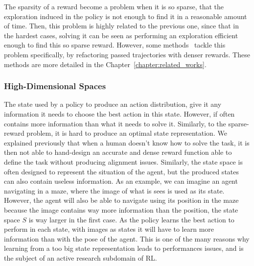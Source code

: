 The sparsity of a reward become a problem when it is so sparse, %
that the exploration induced in the policy is not
enough to find it in a reasonable amount of time.
Then, this problem is highly related to the previous one, since that in the hardest cases, solving it can be seen as
performing an exploration efficient enough to find this so sparse reward.
However, some methods~\citep{andrychowicz2017hindsight, levy2019learning} tackle this problem specifically, by
refactoring passed trajectories with denser rewards.
These methods are more detailed in the Chapter~\ref{chapter:related_works}.

\subsubsection{High-Dimensional Spaces}\label{subsubsection:bg:rl:prblems:high-dimentions}

The state used by a policy to produce an action distribution, give it any information it needs to choose the best action
in this state.
However, if often contains more information than what it needs to solve it.
Similarly, to the sparse-reward problem, it is hard to produce an optimal state representation.
We explained previously that when a human doesn't know how to solve the task, it is then not able to hand-design an accurate
and dense reward function able to define the task without producing alignment issues. %
Similarly, the state space is often designed to represent the situation of the agent, but the produced states can also
contain useless information.
As an example, we can imagine an agent navigating in a maze, where the image of what is sees is used as its state.
However, the agent will also be able to navigate using its position in the maze
because the image contains way more information than the position, the state space $S$ is way larger in the first case. %
%
As the policy learns the best action to perform in each state, 
with images as states it will have to learn more information than with the pose of the agent.
This is one of the many reasons why learning from a too big state representation leads to performances issues, and is
the subject of an active research subdomain of RL\@. %

